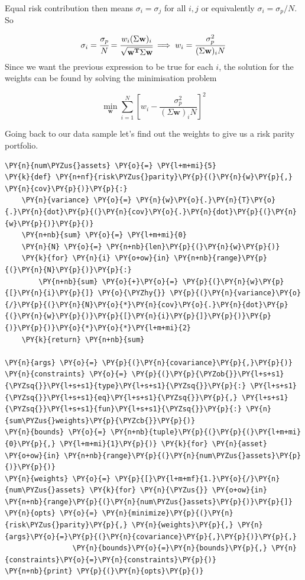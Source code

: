 Equal risk contribution then means \(\sigma _{i} =\sigma _{j}\) for all
\(i,j\) or equivalently \(\sigma _{i}=\sigma_p/N\). So

\[\sigma _{i} = \cfrac{\sigma_p}{N}={\cfrac {w_{i}(\Sigma \mathbf{w})_{i}}{\sqrt {\mathbf{w^T}\Sigma \mathbf{w}}}}\implies w_{i} = \frac {\sigma_p^{2}}{(\Sigma \mathbf{w})_{i}N}\]
Since we want the previous expression to be true for each $i$, the solution for the weights can be found by solving the minimisation problem

\[ \underset{\mathbf{w}}{\min } \sum _{i=1}^{N}\left[w_{i}-{\frac {\sigma_p^{2}}{(\Sigma \mathbf{w})_{i}N}}\right]^{2} \]

Going back to our data sample let's find out the weights to give us a
risk parity portfolio.

\begin{tcolorbox}[breakable, size=fbox, boxrule=1pt, pad at break*=1mm,colback=cellbackground, colframe=cellborder]
\begin{Verbatim}[commandchars=\\\{\}]
\PY{n}{num\PYZus{}assets} \PY{o}{=} \PY{l+m+mi}{5}
\PY{k}{def} \PY{n+nf}{risk\PYZus{}parity}\PY{p}{(}\PY{n}{w}\PY{p}{,} \PY{n}{cov}\PY{p}{)}\PY{p}{:}
    \PY{n}{variance} \PY{o}{=} \PY{n}{w}\PY{o}{.}\PY{n}{T}\PY{o}{.}\PY{n}{dot}\PY{p}{(}\PY{n}{cov}\PY{o}{.}\PY{n}{dot}\PY{p}{(}\PY{n}{w}\PY{p}{)}\PY{p}{)} 
    \PY{n+nb}{sum} \PY{o}{=} \PY{l+m+mi}{0}
    \PY{n}{N} \PY{o}{=} \PY{n+nb}{len}\PY{p}{(}\PY{n}{w}\PY{p}{)}
    \PY{k}{for} \PY{n}{i} \PY{o+ow}{in} \PY{n+nb}{range}\PY{p}{(}\PY{n}{N}\PY{p}{)}\PY{p}{:}
        \PY{n+nb}{sum} \PY{o}{+}\PY{o}{=} \PY{p}{(}\PY{n}{w}\PY{p}{[}\PY{n}{i}\PY{p}{]} \PY{o}{\PYZhy{}} \PY{p}{(}\PY{n}{variance}\PY{o}{/}\PY{p}{(}\PY{n}{N}\PY{o}{*}\PY{n}{cov}\PY{o}{.}\PY{n}{dot}\PY{p}{(}\PY{n}{w}\PY{p}{)}\PY{p}{[}\PY{n}{i}\PY{p}{]}\PY{p}{)}\PY{p}{)}\PY{p}{)}\PY{o}{*}\PY{o}{*}\PY{l+m+mi}{2} 
    \PY{k}{return} \PY{n+nb}{sum}
		
\PY{n}{args} \PY{o}{=} \PY{p}{(}\PY{n}{covariance}\PY{p}{,}\PY{p}{)}
\PY{n}{constraints} \PY{o}{=} \PY{p}{(}\PY{p}{\PYZob{}}\PY{l+s+s1}{\PYZsq{}}\PY{l+s+s1}{type}\PY{l+s+s1}{\PYZsq{}}\PY{p}{:} \PY{l+s+s1}{\PYZsq{}}\PY{l+s+s1}{eq}\PY{l+s+s1}{\PYZsq{}}\PY{p}{,} \PY{l+s+s1}{\PYZsq{}}\PY{l+s+s1}{fun}\PY{l+s+s1}{\PYZsq{}}\PY{p}{:} \PY{n}{sum\PYZus{}weights}\PY{p}{\PYZcb{}}\PY{p}{)} 
\PY{n}{bounds} \PY{o}{=} \PY{n+nb}{tuple}\PY{p}{(}\PY{p}{(}\PY{l+m+mi}{0}\PY{p}{,} \PY{l+m+mi}{1}\PY{p}{)} \PY{k}{for} \PY{n}{asset} \PY{o+ow}{in} \PY{n+nb}{range}\PY{p}{(}\PY{n}{num\PYZus{}assets}\PY{p}{)}\PY{p}{)}
\PY{n}{weights} \PY{o}{=} \PY{p}{[}\PY{l+m+mf}{1.}\PY{o}{/}\PY{n}{num\PYZus{}assets} \PY{k}{for} \PY{n}{\PYZus{}} \PY{o+ow}{in} \PY{n+nb}{range}\PY{p}{(}\PY{n}{num\PYZus{}assets}\PY{p}{)}\PY{p}{]}
\PY{n}{opts} \PY{o}{=} \PY{n}{minimize}\PY{p}{(}\PY{n}{risk\PYZus{}parity}\PY{p}{,} \PY{n}{weights}\PY{p}{,} \PY{n}{args}\PY{o}{=}\PY{p}{(}\PY{n}{covariance}\PY{p}{,}\PY{p}{)}\PY{p}{,}
                \PY{n}{bounds}\PY{o}{=}\PY{n}{bounds}\PY{p}{,} \PY{n}{constraints}\PY{o}{=}\PY{n}{constraints}\PY{p}{)}
\PY{n+nb}{print} \PY{p}{(}\PY{n}{opts}\PY{p}{)}


\end{Verbatim}
\end{tcolorbox}
